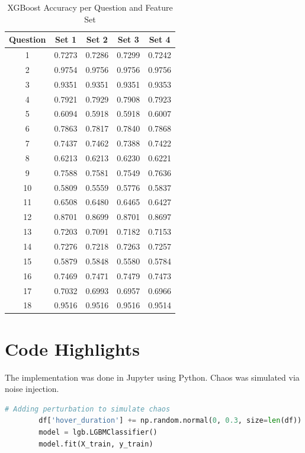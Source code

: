 \documentclass[12pt]{article}
\begin{document}
	\begin{table}[H]
		\centering
		\small
		\caption{XGBoost Accuracy per Question and Feature Set}
		\begin{tabular}{c|cccc}
			\toprule
			\textbf{Question} & \textbf{Set 1} & \textbf{Set 2} & \textbf{Set 3} & \textbf{Set 4} \\
			\midrule
			1  & 0.7273 & 0.7286 & 0.7299 & 0.7242 \\
			2  & 0.9754 & 0.9756 & 0.9756 & 0.9756 \\
			3  & 0.9351 & 0.9351 & 0.9351 & 0.9353 \\
			4  & 0.7921 & 0.7929 & 0.7908 & 0.7923 \\
			5  & 0.6094 & 0.5918 & 0.5918 & 0.6007 \\
			6  & 0.7863 & 0.7817 & 0.7840 & 0.7868 \\
			7  & 0.7437 & 0.7462 & 0.7388 & 0.7422 \\
			8  & 0.6213 & 0.6213 & 0.6230 & 0.6221 \\
			9  & 0.7588 & 0.7581 & 0.7549 & 0.7636 \\
			10 & 0.5809 & 0.5559 & 0.5776 & 0.5837 \\
			11 & 0.6508 & 0.6480 & 0.6465 & 0.6427 \\
			12 & 0.8701 & 0.8699 & 0.8701 & 0.8697 \\
			13 & 0.7203 & 0.7091 & 0.7182 & 0.7153 \\
			14 & 0.7276 & 0.7218 & 0.7263 & 0.7257 \\
			15 & 0.5879 & 0.5848 & 0.5580 & 0.5784 \\
			16 & 0.7469 & 0.7471 & 0.7479 & 0.7473 \\
			17 & 0.7032 & 0.6993 & 0.6957 & 0.6966 \\
			18 & 0.9516 & 0.9516 & 0.9516 & 0.9514 \\
			\bottomrule
		\end{tabular}
		\label{tab:xgb_metrics}
	\end{table}
	
	\section{Code Highlights}
	The implementation was done in Jupyter using Python. Chaos was simulated via noise injection.
	
	\begin{lstlisting}[language=Python, caption=Injecting Perturbations, basicstyle=\ttfamily\small]
		# Adding perturbation to simulate chaos
		df['hover_duration'] += np.random.normal(0, 0.3, size=len(df))
		model = lgb.LGBMClassifier()
		model.fit(X_train, y_train)
	\end{lstlisting}
	
\end{document}
